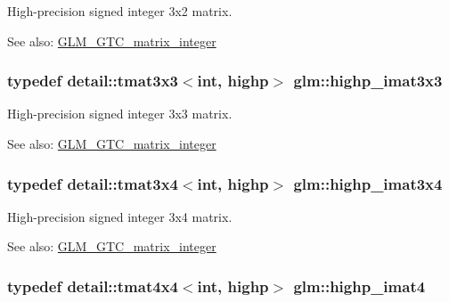 High-precision signed integer 3x2 matrix. \begin{Desc}
\item[See also:]\hyperlink{group__gtc__matrix__integer}{GLM\_\-GTC\_\-matrix\_\-integer} \end{Desc}
\hypertarget{group__gtc__matrix__integer_g4e7c11e49de5d71067b95a87c84308a8}{
\subsubsection[highp\_\-imat3x3]{\setlength{\rightskip}{0pt plus 5cm}typedef detail::tmat3x3$<$int, highp$>$ {\bf glm::highp\_\-imat3x3}}}
\label{group__gtc__matrix__integer_g4e7c11e49de5d71067b95a87c84308a8}


High-precision signed integer 3x3 matrix. \begin{Desc}
\item[See also:]\hyperlink{group__gtc__matrix__integer}{GLM\_\-GTC\_\-matrix\_\-integer} \end{Desc}
\hypertarget{group__gtc__matrix__integer_g97ddf84f7ae0c5d4d3ecc18bb1d47449}{
\subsubsection[highp\_\-imat3x4]{\setlength{\rightskip}{0pt plus 5cm}typedef detail::tmat3x4$<$int, highp$>$ {\bf glm::highp\_\-imat3x4}}}
\label{group__gtc__matrix__integer_g97ddf84f7ae0c5d4d3ecc18bb1d47449}


High-precision signed integer 3x4 matrix. \begin{Desc}
\item[See also:]\hyperlink{group__gtc__matrix__integer}{GLM\_\-GTC\_\-matrix\_\-integer} \end{Desc}
\hypertarget{group__gtc__matrix__integer_g9ca2f5624891bd1ac993fcde4dd24ac1}{
\subsubsection[highp\_\-imat4]{\setlength{\rightskip}{0pt plus 5cm}typedef detail::tmat4x4$<$int, highp$>$ {\bf glm::highp\_\-imat4}}}
\label{group__gtc__matrix__integer_g9ca2f5624891bd1ac993fcde4dd24ac1}


